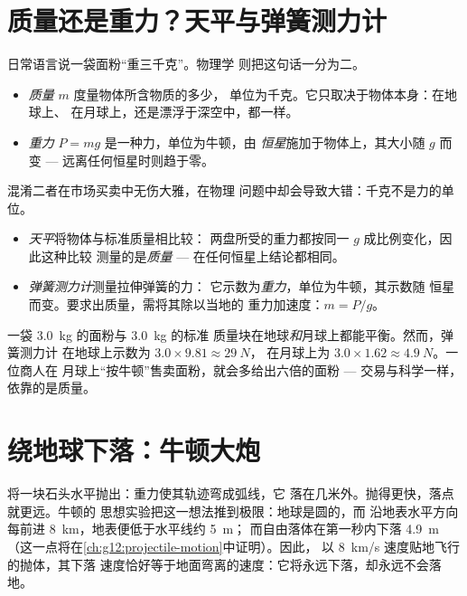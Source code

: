 \section{质量还是重力？天平与弹簧测力计}

日常语言说一袋面粉“重三千克”。物理学
则把这句话一分为二。

\begin{remark}[质量不是重力]\label{rem:g10:universal-gravitation:massweight}
\begin{itemize}
  \item \emph{质量} $m$ 度量物体所含物质的多少，
        单位为千克。它只取决于物体本身：在地球上、
        在月球上，还是漂浮于深空中，都一样。
  \item \emph{重力} $P = mg$ 是一种力，单位为牛顿，由
        \emph{恒星}施加于物体上，其大小随
        $g$ 而变 --- 远离任何恒星时则趋于零。
\end{itemize}
混淆二者在市场买卖中无伤大雅，在物理
问题中却会导致大错：千克不是力的单位。
\end{remark}

\begin{method}[天平与弹簧测力计]\label{met:g10:universal-gravitation:instruments}
\begin{itemize}
  \item \emph{天平}将物体与标准质量相比较：
        两盘所受的重力都按同一 $g$ 成比例变化，因此这种比较
        测量的是\emph{质量} --- 在任何恒星上结论都相同。
  \item \emph{弹簧测力计}测量拉伸弹簧的力：
        它示数为\emph{重力}，单位为牛顿，其示数随
        恒星而变。要求出质量，需将其除以当地的
        重力加速度：$m = P/g$。
\end{itemize}
\end{method}

\begin{example}[月球上的面粉]\label{ex:g10:universal-gravitation:flour}
一袋 \qty{3.0}{kg} 的面粉与 \qty{3.0}{kg} 的标准
质量块在地球\emph{和}月球上都能平衡。然而，弹簧测力计
在地球上示数为 $3.0 \times 9.81 \approx \qty{29}{N}$，
在月球上为 $3.0 \times 1.62 \approx \qty{4.9}{N}$。一位商人在
月球上“按牛顿”售卖面粉，就会多给出六倍的面粉 ---
交易与科学一样，依靠的是质量。
\end{example}

\section{绕地球下落：牛顿大炮}

将一块石头水平抛出：重力使其轨迹弯成弧线，它
落在几米外。抛得更快，落点就更远。牛顿的
思想实验把这一想法推到极限：地球是圆的，而
沿地表水平方向每前进 \qty{8}{km}，地表便低于水平线约 \qty{5}{m}；
而自由落体在第一秒内下落 \qty{4.9}{m}
（这一点将在\cref{ch:g12:projectile-motion}中证明）。因此，
以 \qty{8}{km/s} 速度贴地飞行的抛体，其下落
速度恰好等于地面弯离的速度：它将永远下落，却永远不会落地。

